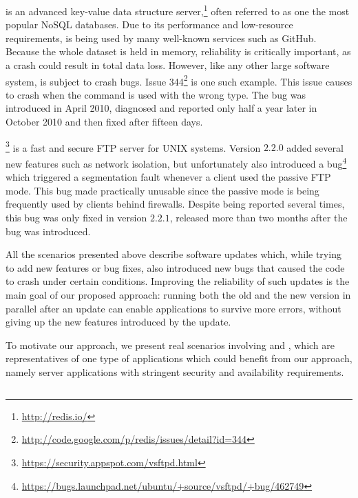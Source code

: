 \redis is an advanced key-value data structure
server,\footnote{\url{http://redis.io/}} often referred to as one the most
popular NoSQL databases.  Due to its performance and low-resource requirements,
\redis is being used by many well-known services such as GitHub.  Because the
whole dataset is held in memory, reliability is critically important, as a
crash could result in total data loss.  However, like any other large software
system, \redis is subject to crash bugs. Issue
344\footnote{\url{http://code.google.com/p/redis/issues/detail?id=344}} is one
such example.  This issue causes \redis to crash when the 
command is used with the wrong type. The bug was introduced in April 2010,
diagnosed and reported only half a year later in October 2010 and then fixed
after fifteen days.

\vsftpd\footnote{\url{https://security.appspot.com/vsftpd.html}} is a fast and 
secure FTP server for UNIX systems.  Version $2.2.0$ added several new
features such as network isolation, but unfortunately also introduced
a bug\footnote{\url{https://bugs.launchpad.net/ubuntu/+source/vsftpd/+bug/462749}}
which triggered a segmentation fault whenever a client used the
passive FTP mode.  This bug made \vsftpd practically unusable since
the passive mode is being frequently used by clients behind firewalls.
Despite being reported several times, this bug was only fixed in
version $2.2.1$, released more than two months after the bug was
introduced.

All the scenarios presented above describe software updates which,
while trying to add new features or bug fixes, also introduced new
bugs that caused the code to crash under certain conditions.
Improving the reliability of such updates is the main goal of our
proposed approach: running both the old and the new version in
parallel after an update can enable applications to survive more
errors, without giving up the new features introduced by the update.


To motivate our approach, we present real scenarios involving \lighttpd and
\redis, which are representatives of one type of applications which could
benefit from our approach, namely server applications with stringent security
and availability requirements.

\subsection{\lighttpd}

